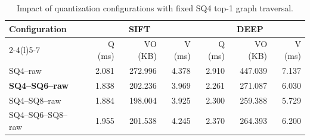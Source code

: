 \begin{table}[!t]
\centering
\caption{Impact of quantization configurations with fixed SQ4 top-1 graph traversal.}
\label{tab:quantization}
\footnotesize
\setlength{\tabcolsep}{2.5pt}
\renewcommand{\arraystretch}{1.15}
\begin{tabular}{lrrrrrr}
\toprule
\multirow{2}{*}{Configuration}
& \multicolumn{3}{c}{\textsf{SIFT}} & \multicolumn{3}{c}{\textsf{DEEP}} \\
\cmidrule(lr){2-4}\cmidrule(l){5-7}
& Q (ms) & VO (KB) & V (ms) & Q (ms) & VO (KB) & V (ms) \\
\midrule
SQ4--raw & 2.081 & 272.996 & 4.378 & 2.910 & 447.039 & 7.137 \\
\textbf{SQ4--SQ6--raw} & 1.838 & 202.236 & 3.969 & 2.261 & 271.087 & 6.030 \\
SQ4--SQ8--raw & 1.884 & 198.004 & 3.925 & 2.300 & 259.388 & 5.729 \\
SQ4--SQ6--SQ8--raw & 1.955 & 201.538 & 4.245 & 2.370 & 264.393 & 6.200 \\
\bottomrule
\end{tabular}
\end{table}
